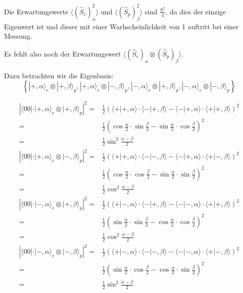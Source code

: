 \documentclass[11pt, ngerman, fleqn, DIV=15, headinclude]{scrartcl}
\begin{document}
\subsection{}
	Die Erwartungswerte  $\langle(\hat{S}_e)^2_\alpha\rangle$ und $\langle(\hat{S}_p)^2_\beta\rangle$ sind $\frac{\hbar^2}{4}$, da dies der einzige Eigenwert ist und dieser mit einer Warhscheinlichkeit von 1 auftritt bei einer Messung.
	
	Es fehlt  also  noch der Erwartungswert  $\langle(\hat{S}_e)_\alpha\otimes(\hat{S}_p)_\beta\rangle$.

	Dazu betrachten wir die Eigenbasis:
	\[ \left\{ |+,\alpha\rangle_e\otimes|+,\beta\rangle_p, |+,\alpha\rangle_e\otimes|-,\beta\rangle_p, |-,\alpha\rangle_e\otimes|+,\beta\rangle_p, |-,\alpha\rangle_e\otimes|-,\beta\rangle_p\right\} \]

	\begin{align*}
		\left|\langle00|\cdot |+,\alpha\rangle_e\otimes|+,\beta\rangle_p\right|^2=&
			\frac{1}{2}\left(\langle+|+,\alpha\rangle\cdot\langle-|+,\beta\rangle-\langle-|+,\alpha\rangle\cdot\langle+|+,\beta\rangle\right)^2 \\
			=&\frac{1}{2} \left( \cos\frac{\alpha}{2}\cdot\sin\frac{\beta}{2}-\sin\frac{\alpha}{2}\cdot\cos\frac{\beta}{2}\right)^2 \\
			=& \frac{1}{2}\sin^2\frac{\alpha-\beta}{2} \\
		\left|\langle00|\cdot |+,\alpha\rangle_e\otimes|-,\beta\rangle_p\right|^2=&
			\frac{1}{2}\left(\langle+|+,\alpha\rangle\cdot\langle-|-,\beta\rangle-\langle-|+,\alpha\rangle\cdot\langle+|-,\beta\rangle\right)^2 \\
			=&\frac{1}{2} \left( \cos\frac{\alpha}{2}\cdot\cos\frac{\beta}{2}-\sin\frac{\alpha}{2}\cdot\sin\frac{\beta}{2}\right)^2 \\
			=& \frac{1}{2}\cos^2\frac{\alpha-\beta}{2} \\
	\left|\langle00|\cdot |-,\alpha\rangle_e\otimes|+,\beta\rangle_p\right|^2=&
			\frac{1}{2}\left(\langle+|-,\alpha\rangle\cdot\langle-|+,\beta\rangle-\langle-|-,\alpha\rangle\cdot\langle+|+,\beta\rangle\right)^2 \\
			=&\frac{1}{2} \left( \sin\frac{\alpha}{2}\cdot\sin\frac{\beta}{2}-\cos\frac{\alpha}{2}\cdot\cos\frac{\beta}{2}\right)^2 \\
			=& \frac{1}{2}\cos^2\frac{\alpha-\beta}{2} \\
\left|\langle00|\cdot |-,\alpha\rangle_e\otimes|-,\beta\rangle_p\right|^2=&
			\frac{1}{2}\left(\langle+|-,\alpha\rangle\cdot\langle-|-,\beta\rangle-\langle-|-,\alpha\rangle\cdot\langle+|-,\beta\rangle\right)^2 \\
			=&\frac{1}{2} \left( \sin\frac{\alpha}{2}\cdot\cos\frac{\beta}{2}-\cos\frac{\alpha}{2}\cdot\sin\frac{\beta}{2}\right)^2 \\
			=& \frac{1}{2}\sin^2\frac{\alpha-\beta}{2}
	\end{align*}
	
\end{document}
